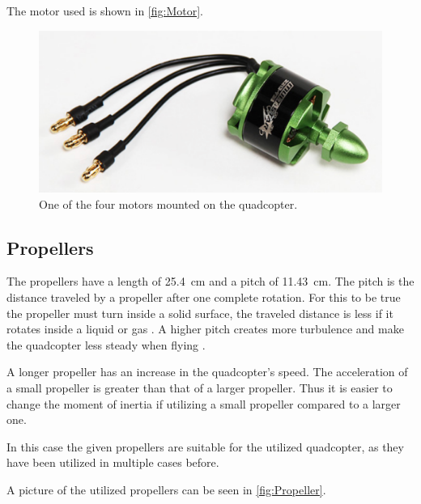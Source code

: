 The motor used is shown in \autoref{fig:Motor}.
\begin{figure}[H]
	\centering
	\includegraphics[scale=0.4]{figures/motor.png}
	\caption{One of the four motors mounted on the quadcopter.\cite{HkingPropeller}}
	\label{fig:Motor}
\end{figure} 

\subsection{Propellers}
The propellers have a length of \SI{25.4}{cm} and a pitch of \SI{11.43}{cm}. The pitch is the distance traveled by a propeller after one complete rotation. For this to be true the propeller must turn inside a solid surface, the traveled distance is less if it rotates inside a liquid or gas \cite{EReyes}. A higher pitch creates more turbulence and make the quadcopter less steady when flying \cite{oscarliang}.

A longer propeller has an increase in the quadcopter's speed. The acceleration of a small propeller is greater than that of a larger propeller. Thus it is easier to change the moment of inertia if utilizing a small propeller compared to a larger one. \cite{oscarliang}

In this case the given propellers are suitable for the utilized quadcopter, as they have been utilized in multiple cases before. 

A picture of the utilized propellers can be seen in \autoref{fig:Propeller}.

